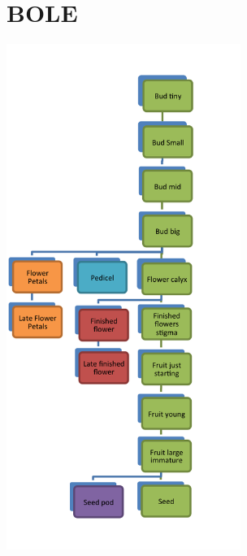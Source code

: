 \documentclass[10pt]{book} %
\begin{document}
\section{BOLE}
\begin{multicols}{2}
\includegraphics[width=3in]{images/BOLE.png}
\vfill
\columnbreak

\end{multicols}


\clearpage
\newpage
\end{document}
